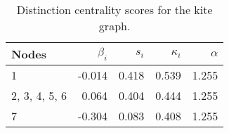 \begin{table}
\centering
\caption{\label{tab:kite}Distinction centrality scores for the kite graph.}
\centering
\begin{tabular}[t]{lrrrr}
\toprule
Nodes & $\beta_i$ & $s_i$ & $\kappa_i$ & $\alpha$\\
\midrule
1 & -0.014 & 0.418 & 0.539 & 1.255\\
2, 3, 4, 5, 6 & 0.064 & 0.404 & 0.444 & 1.255\\
7 & -0.304 & 0.083 & 0.408 & 1.255\\
\bottomrule
\end{tabular}
\end{table}
